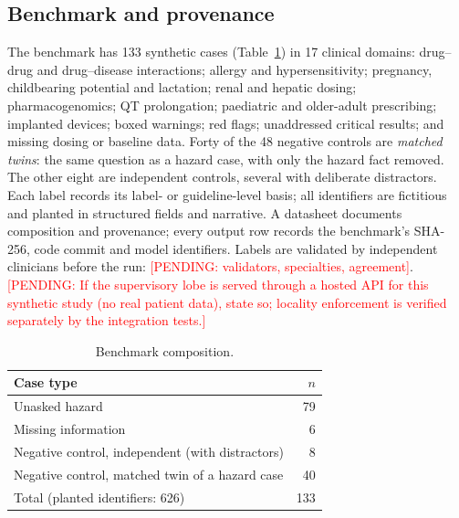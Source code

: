 \documentclass[journal]{IEEEtran}
\newcommand{\pending}[1]{\textcolor{red}{[PENDING: #1]}}
\begin{document}
\subsection{Benchmark and provenance}
The benchmark has 133 synthetic cases (Table~\ref{tab:bench}) in 17 clinical domains: drug--drug and drug--disease interactions; allergy and hypersensitivity; pregnancy, childbearing potential and lactation; renal and hepatic dosing; pharmacogenomics; QT prolongation; paediatric \cite{fda2017} and older-adult \cite{ags2023} prescribing; implanted devices; boxed warnings; red flags; unaddressed critical results; and missing dosing or baseline data. Forty of the 48 negative controls are \emph{matched twins}: the same question as a hazard case, with only the hazard fact removed. The other eight are independent controls, several with deliberate distractors. Each label records its label- or guideline-level basis; all identifiers are fictitious and planted in structured fields and narrative. A datasheet \cite{gebru2021} documents composition and provenance; every output row records the benchmark's SHA-256, code commit and model identifiers. Labels are validated by independent clinicians before the run: \pending{validators, specialties, agreement}. \pending{If the supervisory lobe is served through a hosted API for this synthetic study (no real patient data), state so; locality enforcement is verified separately by the integration tests.}

\begin{table}[!t]
\caption{Benchmark composition.}
\label{tab:bench}
\centering\footnotesize
\begin{tabular}{@{}lr@{}}
\toprule
Case type & $n$\\\midrule
Unasked hazard & 79\\
Missing information & 6\\
Negative control, independent (with distractors) & 8\\
Negative control, matched twin of a hazard case & 40\\\midrule
Total (planted identifiers: 626) & 133\\\bottomrule
\end{tabular}
\end{table}
\end{document}
